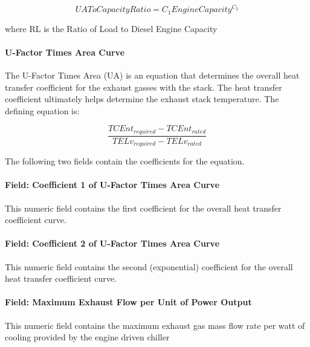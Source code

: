 \begin{equation}
    UAToCapacityRatio = {C_1}EngineCapacit{y^{{C_2}}}
\end{equation}

where RL is the Ratio of Load to Diesel Engine Capacity

\paragraph{U-Factor Times Area Curve}\label{u-factor-times-area-curve}

The U-Factor Times Area (UA) is an equation that determines the overall heat transfer coefficient for the exhaust gasses with the stack. The heat transfer coefficient ultimately helps determine the exhaust stack temperature. The defining equation is:

\begin{equation}
    \frac{{TCEn{t_{required}} - TCEn{t_{rated}}}}{{TEL{v_{required}} - TEL{v_{rated}}}}
\end{equation}

The following two fields contain the coefficients for the equation.

\paragraph{Field: Coefficient 1 of U-Factor Times Area Curve}\label{field-coefficient-1-of-u-factor-times-area-curve-000}

This numeric field contains the first coefficient for the overall heat transfer coefficient curve.

\paragraph{Field: Coefficient 2 of U-Factor Times Area Curve}\label{field-coefficient-2-of-u-factor-times-area-curve-000}

This numeric field contains the second (exponential) coefficient for the overall heat transfer coefficient curve.

\paragraph{Field: Maximum Exhaust Flow per Unit of Power Output}\label{field-maximum-exhaust-flow-per-unit-of-power-output-000}

This numeric field contains the maximum exhaust gas mass flow rate per watt of cooling provided by the engine driven chiller

